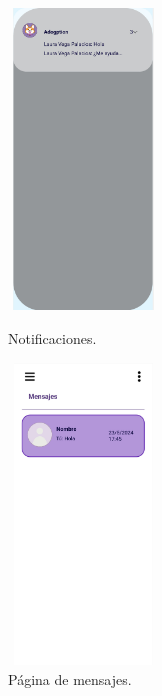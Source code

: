 \documentclass[a4paper, 12pt]{article}
\begin{document}
\begin{figure}[H]
   	\begin{minipage}{0.48\textwidth}
		\begin{center}
			{\includegraphics[height=8cm, width=4cm]{Notification.jpg}\par}
			\caption{Notificaciones.}
			\medskip
		\end{center}  
	\end{minipage}\hfill
   	\begin{minipage}{0.48\textwidth}
		\begin{center}
			{\includegraphics[height=8cm, width=4cm]{Messages.jpg}\par}
			\caption{Página de mensajes.}
			\medskip
		\end{center}  
	\end{minipage}\hfill
\end{figure}
\end{document}
